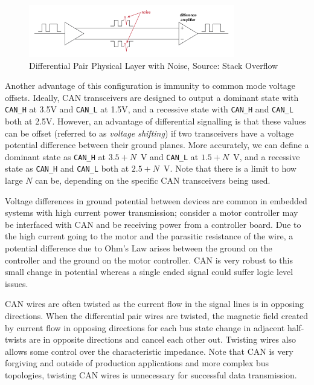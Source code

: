 \documentclass[main.tex]{subfiles}
\begin{document}
\begin{figure}[H]
    \centering
    \includegraphics[width=0.8\textwidth]{images/diff_pair_noise_immunity.png}
    \caption{Differential Pair Physical Layer with Noise, Source: Stack Overflow \cite{stackoverflow_diff_pair_noise}}
    \label{fig:diff-physical-layer-noise}
\end{figure}

\noindent Another advantage of this configuration is immunity to common mode voltage offsets. Ideally, CAN transceivers are designed to output a dominant state with \texttt{CAN\_H} at 3.5V and \texttt{CAN\_L} at 1.5V, and a recessive state with \texttt{CAN\_H} and \texttt{CAN\_L} both at 2.5V. However, an advantage of differential signalling is that these values can be offset (referred to as \textit{voltage shifting}) if two transceivers have a voltage potential difference between their ground planes. More accurately, we can define a dominant state as \texttt{CAN\_H} at \(3.5 + N\)~V and \texttt{CAN\_L} at \(1.5 + N\)~V, and a recessive state as \texttt{CAN\_H} and \texttt{CAN\_L} both at \(2.5 + N\)~V. Note that there is a limit to how large \(N\) can be, depending on the specific CAN transceivers being used.

\noindent Voltage differences in ground potential between devices are common in embedded systems with high current power transmission; consider a motor controller may be interfaced with CAN and be receiving power from a controller board. Due to the high current going to the motor and the parasitic resistance of the wire, a potential difference due to Ohm's Law arises between the ground on the controller and the ground on the motor controller. CAN is very robust to this small change in potential whereas a single ended signal could suffer logic level issues. \newline

\noindent CAN wires are often twisted as the current flow in the signal lines is in opposing directions. When the differential pair wires are twisted, the magnetic field created by current flow in opposing directions for each bus state change in adjacent half-twists are in opposite directions and cancel each other out. Twisting wires also allows some control over the characteristic impedance. Note that CAN is very forgiving and outside of production applications and more complex bus topologies, twisting CAN wires is unnecessary for successful data transmission. 
\end{document}
